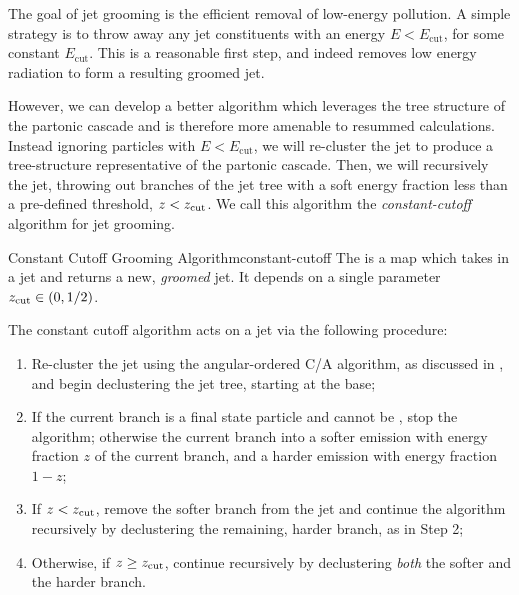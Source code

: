 The goal of jet grooming is the efficient removal of low-energy pollution.
%
A simple strategy is to throw away any jet constituents with an energy \(E < E_\text{cut}\), for some constant \(E_\text{cut}\).
%
This is a reasonable first step, and indeed removes low energy radiation to form a resulting groomed jet.

However, we can develop a better algorithm which leverages the tree structure of the partonic cascade and is therefore more amenable to resummed calculations.
%
Instead ignoring particles with \(E < E_\text{cut}\), we will re-cluster the jet to produce a tree-structure representative of the partonic cascade.
%
Then, we will recursively  the jet, throwing out branches of the jet tree with a soft energy fraction less than a pre-defined threshold, \(z < z_{\rm cut}\).
%
We call this algorithm the \textit{\gls{constant-cutoff}} algorithm for jet grooming.


\begin{definitionbox}{Constant Cutoff Grooming Algorithm}{constant-cutoff}
    The  is a map which takes in a jet and returns a new, \textit{groomed} jet.
    It depends on a single parameter \(z_{\rm cut} \in (0, 1/2)\).

    The constant cutoff algorithm acts on a jet via the following procedure:
    \begin{enumerate}
        \item
            Re-cluster the jet using the angular-ordered C/A algorithm, as discussed in , and begin \gls{declustering} the jet tree, starting at the base;

        \item
            If the current branch is a final state particle and cannot be , stop the algorithm;
            otherwise  the current branch into a softer emission with energy fraction \(z\) of the current branch, and a harder emission with energy fraction \(1-z\);

        \item
            If \(z < z_{\rm cut}\), remove the softer branch from the jet and continue the algorithm recursively by declustering the remaining, harder branch, as in Step 2;

        \item
            Otherwise, if \(z \geq z_{\rm cut}\), continue recursively by \gls{declustering} \textit{both} the softer and the harder branch.
    \end{enumerate}
\end{definitionbox}

